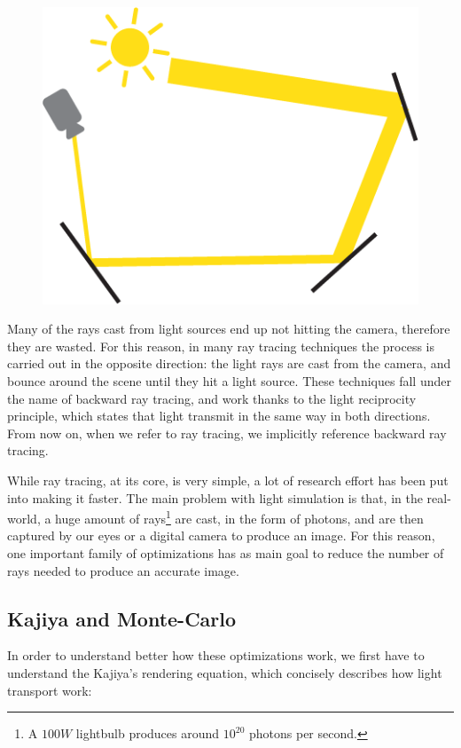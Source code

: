 \documentclass[11pt,a4paper,twocolumn]{article}
\begin{document}
\begin{figure}[H]
    \centering
    \includegraphics[width=\textwidth*\real{0.22}]{Images/ray_tracing_simple.png}
    \label{fig:ray_tracing_simple}
\end{figure}

Many of the rays cast from light sources end up not hitting the camera, therefore they are wasted. For this reason, in many ray tracing techniques the process is carried out in the opposite direction: the light rays are cast from the camera, and bounce around the scene until they hit a light source. These techniques fall under the name of backward ray tracing, and work thanks to the light reciprocity principle, which states that light transmit in the same way in both directions. From now on, when we refer to ray tracing, we implicitly reference backward ray tracing.

While ray tracing, at its core, is very simple, a lot of research effort has been put into making it faster. The main problem with light simulation is that, in the real-world, a huge amount of rays\footnote{A $100W$ lightbulb produces around $10^{20}$ photons per second.} are cast, in the form of photons, and are then captured by our eyes or a digital camera to produce an image. For this reason, one important family of optimizations has as main goal to reduce the number of rays needed to produce an accurate image.

\subsection{Kajiya and Monte-Carlo}
In order to understand better how these optimizations work, we first have to understand the Kajiya's rendering equation, which concisely describes how light transport work:
\end{document}
